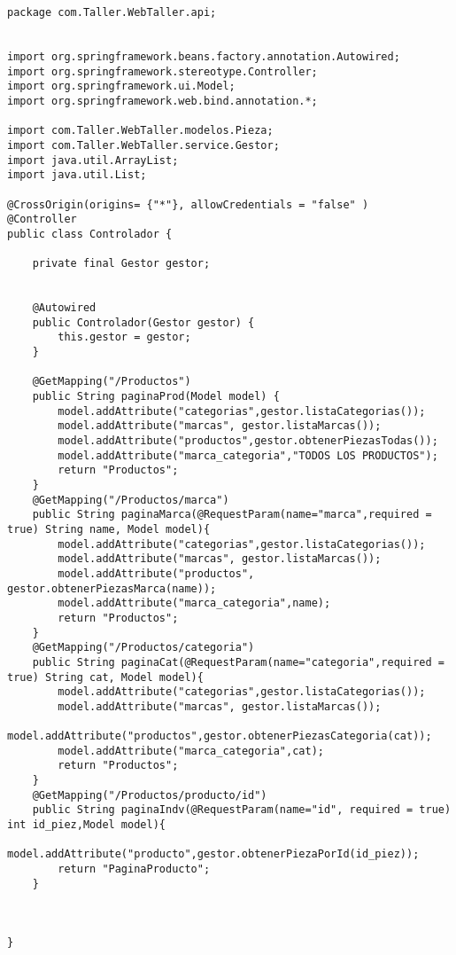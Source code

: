 

\begin{lstlisting}[caption=Controlador.java (LSMI)]
package com.Taller.WebTaller.api;


import org.springframework.beans.factory.annotation.Autowired;
import org.springframework.stereotype.Controller;
import org.springframework.ui.Model;
import org.springframework.web.bind.annotation.*;

import com.Taller.WebTaller.modelos.Pieza;
import com.Taller.WebTaller.service.Gestor;
import java.util.ArrayList;
import java.util.List;

@CrossOrigin(origins= {"*"}, allowCredentials = "false" )
@Controller
public class Controlador {

    private final Gestor gestor;


    @Autowired
    public Controlador(Gestor gestor) {
        this.gestor = gestor;
    }

    @GetMapping("/Productos")
    public String paginaProd(Model model) {
        model.addAttribute("categorias",gestor.listaCategorias());
        model.addAttribute("marcas", gestor.listaMarcas());
        model.addAttribute("productos",gestor.obtenerPiezasTodas());
        model.addAttribute("marca_categoria","TODOS LOS PRODUCTOS");
        return "Productos";
    }
    @GetMapping("/Productos/marca")
    public String paginaMarca(@RequestParam(name="marca",required = true) String name, Model model){
        model.addAttribute("categorias",gestor.listaCategorias());
        model.addAttribute("marcas", gestor.listaMarcas());
        model.addAttribute("productos", gestor.obtenerPiezasMarca(name));
        model.addAttribute("marca_categoria",name);
        return "Productos";
    }
    @GetMapping("/Productos/categoria")
    public String paginaCat(@RequestParam(name="categoria",required = true) String cat, Model model){
        model.addAttribute("categorias",gestor.listaCategorias());
        model.addAttribute("marcas", gestor.listaMarcas());
        model.addAttribute("productos",gestor.obtenerPiezasCategoria(cat));
        model.addAttribute("marca_categoria",cat);
        return "Productos";
    }
    @GetMapping("/Productos/producto/id")
    public String paginaIndv(@RequestParam(name="id", required = true) int id_piez,Model model){
        model.addAttribute("producto",gestor.obtenerPiezaPorId(id_piez));
        return "PaginaProducto";
    }



}
\end{lstlisting}
\clearpage